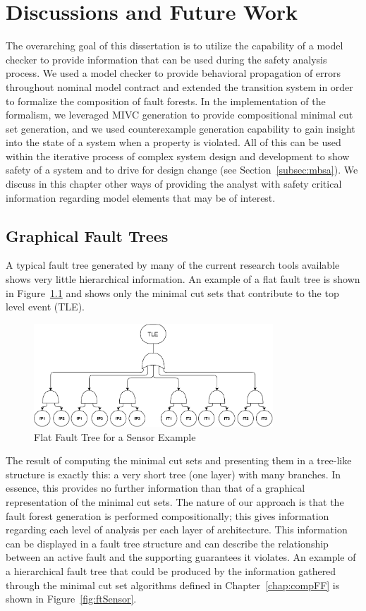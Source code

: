 \chapter{Discussions and Future Work}
\label{ch:discussion}
The overarching goal of this dissertation is to utilize the capability of a model checker to provide information that can be used during the safety analysis process. We used a model checker to provide behavioral propagation of errors throughout nominal model contract and extended the transition system in order to formalize the composition of fault forests. In the implementation of the formalism, we leveraged MIVC generation to provide compositional minimal cut set generation, and we used counterexample generation capability to gain insight into the state of a system when a property is violated. All of this can be used within the iterative process of complex system design and development to show safety of a system and to drive for design change (see Section~\ref{subsec:mbsa}). We discuss in this chapter other ways of providing the analyst with safety critical information regarding model elements that may be of interest. 

\section{Graphical Fault Trees}
A typical fault tree generated by many of the current research tools available shows very little hierarchical information. An example of a flat fault tree is shown in Figure~\ref{fig:flatFT} and shows only the minimal cut sets that contribute to the top level event (TLE). 
\begin{figure}[h!]
	\centering
	\includegraphics[trim=0 0 0 0,clip,width=0.8\textwidth]{images/flatFT.pdf}
	\caption{Flat Fault Tree for a Sensor Example}
	\label{fig:flatFT}
\end{figure}

The result of computing the minimal cut sets and presenting them in a tree-like structure is exactly this: a very short tree (one layer) with many branches. In essence, this provides no further information than that of a graphical representation of the minimal cut sets. The nature of our approach is that the fault forest generation is performed compositionally; this gives information regarding each level of analysis per each layer of architecture. This information can be displayed in a fault tree structure and can describe the relationship between an active fault and the supporting guarantees it violates. An example of a hierarchical fault tree that could be produced by the information gathered through the minimal cut set algorithms defined in Chapter~\ref{chap:compFF} is shown in Figure~\ref{fig:ftSensor}. 


